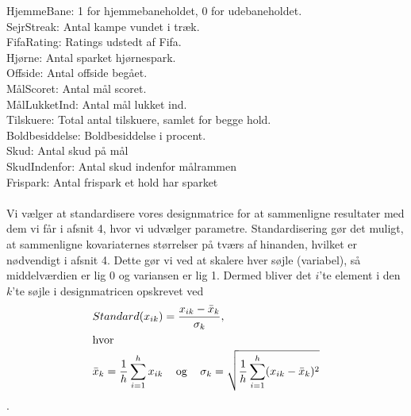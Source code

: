 \documentclass[11pt,a4paper]{article}
\begin{document}
HjemmeBane: 1 for hjemmebaneholdet, 0 for udebaneholdet.\\
SejrStreak: Antal kampe vundet i træk.\\
FifaRating: Ratings udstedt af Fifa.\\
Hjørne: Antal sparket hjørnespark.\\
Offside: Antal offside begået.\\
MålScoret: Antal mål scoret. \\
MålLukketInd: Antal mål lukket ind.\\
Tilskuere: Total antal tilskuere, samlet for begge hold.\\
Boldbesiddelse: Boldbesiddelse i procent.\\
Skud: Antal skud på mål\\
SkudIndenfor: Antal skud indenfor målrammen\\
Frispark: Antal frispark et hold har sparket\\
\\ Vi vælger at standardisere vores designmatrice for at sammenligne resultater med dem vi får i afsnit 4, hvor vi udvælger parametre. Standardisering gør det muligt, at sammenligne kovariaternes størrelser på tværs af hinanden, hvilket er nødvendigt i afsnit 4. Dette gør vi ved at skalere hver søjle (variabel), så middelværdien er lig 0 og variansen er lig 1. Dermed bliver det $i$'te element i den $k$'te søjle i designmatricen opskrevet ved
\begin{align*}
    Standard(x_{ik}) &=\frac{x_{ik}-\Bar{x}_k}{\sigma_k},\\
    \intertext{hvor}
    \Bar{x}_k = \frac{1}{h}\sum_{i=1}^h{x_{ik}} &\text{\;\;\; og\;\;\; } \sigma_k = \sqrt{\frac{1}{h}\sum_{i=1}^h(x_{ik}-\Bar{x}_k)^2} 
\end{align*}.
\end{document}
